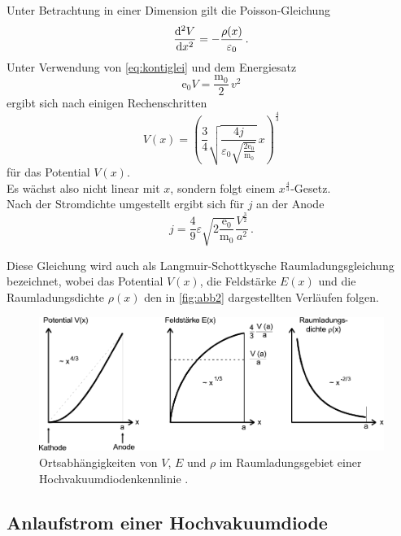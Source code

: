 Unter Betrachtung in einer Dimension gilt die Poisson-Gleichung
\begin{equation}
    \dfrac{\mathrm{d}^2 V}{\mathrm{d} x^2} = - \dfrac{\rho (x)}{\varepsilon_0} \,.
\end{equation}
Unter Verwendung von \eqref{eq:kontiglei} und dem Energiesatz
\begin{equation*}
    \text{e}_0 V = \dfrac{\text{m}_0}{2} \, v^2
\end{equation*}
ergibt sich nach einigen Rechenschritten
\begin{equation*}
    V(x) = \left(\dfrac{3}{4} \sqrt{\dfrac{4j}{\varepsilon_0 \sqrt{\frac{2\text{e}_0}{\text{m}_0}}}} \, x \right)^{\frac{4}{3}}
    \label{eq:potential}
\end{equation*}
für das Potential $V(x)$. \\

Es wächst also nicht linear mit $x$, sondern folgt einem $x^{\frac{4}{3}}$-Gesetz. \\

Nach der Stromdichte umgestellt ergibt sich für $j$ an der Anode
\begin{equation}
    j = \dfrac{4}{9} \varepsilon \sqrt{2\frac{\text{e}_0}{\text{m}_0}} \dfrac{V^{\frac{3}{2}}}{a^2} \,.
    \label{eq:anodestromdichte}
\end{equation}

Diese Gleichung wird auch als Langmuir-Schottkysche Raumladungsgleichung bezeichnet,
wobei das Potential $V(x)$, die Feldstärke $E(x)$ und die Raumladungsdichte $\rho(x)$
den in \autoref{fig:abb2} dargestellten Verläufen folgen.

\begin{figure}[H]
    \centering
    \includegraphics{figures/Abb4.pdf}
    \caption{Ortsabhängigkeiten von $V$, $E$ und $\rho$ im Raumladungsgebiet
             einer Hochvakuumdiodenkennlinie \cite{ap09}.}
    \label{fig:abb4}
\end{figure}


\subsection{Anlaufstrom einer Hochvakuumdiode}

